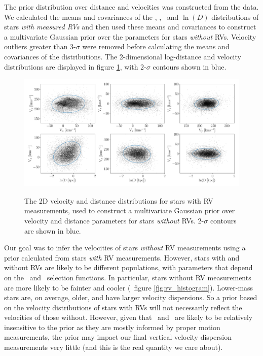 The prior distribution over distance and velocities was constructed from the
data.
We calculated the means and covariances of the \vx, \vy, \vz\ and $\ln(D)$
distributions of stars {\it with measured RVs} and then used these means and
covariances to construct a multivariate Gaussian prior over the parameters for
stars {\it without} RVs.
Velocity outliers greater than 3-$\sigma$ were removed before calculating the
means and covariances of the distributions.
The 2-dimensional log-distance and velocity distributions are displayed in
figure \ref{fig:prior_distributions_2D}, with 2-$\sigma$ contours shown in
blue.
\begin{figure}[ht!]
\caption{
The 2D velocity and distance distributions for stars with RV measurements,
    used to construct a multivariate Gaussian prior over velocity and
    distance parameters for stars {\it without} RVs.
2-$\sigma$ contours are shown in blue.
}
  \centering
    \includegraphics[width=1\textwidth]{prior_distributions_2D}
\label{fig:prior_distributions_2D}
\end{figure}

Our goal was to infer the velocities of stars {\it without} RV measurements
using a prior calculated from stars {\it with} RV measurements.
However, stars with and without RVs are likely to be different populations,
with parameters that depend on the \gaia\ and \lamost\ selection functions.
In particular, stars without RV measurements are more likely to be fainter and
cooler (\eg\ figure \ref{fig:rv_histogram}).
Lower-mass stars are, on average, older, and have larger velocity dispersions.
So a prior based on the velocity distributions of stars with RVs will not
necessarily reflect the velocities of those without.
However, given that \vx\ and \vz\ are likely to be relatively insensitive to
the prior as they are mostly informed by proper motion measurements, the prior
may impact our final vertical velocity dispersion measurements very little
(and this is the real quantity we care about).

